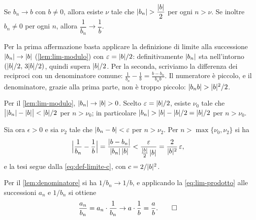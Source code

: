 \begin{lemma}\label{lem:denominatore}
Se $b_{n}\to b$ con $b\neq0$, allora esiste $\nu$ tale che $\lvert b_{n}\rvert>\dfrac{\lvert b\rvert}{2}$
per ogni $n>\nu$. Se inoltre $b_{n}\neq0$ per ogni $n$, allora
$\dfrac1{b_{n}}\to\dfrac1b$.
\end{lemma}

\begin{schema}
\end{schema}

\begin{strategia}
Per la prima affermazione basta applicare la definizione di limite alla successione
$\lvert b_{n}\rvert\to\lvert b\rvert$ (\cref{lem:lim-modulo}) con $\varepsilon=\lvert b\rvert/2$: definitivamente
$\lvert b_{n}\rvert$ sta nell'intorno $(\lvert b\rvert/2,\,3\lvert b\rvert/2)$, quindi supera $\lvert b\rvert/2$. Per la
seconda, scriviamo la differenza dei reciproci con un denominatore comune:
$\frac1{b_{n}}-\frac1b=\frac{b-b_{n}}{b_{n}b}$. Il numeratore è piccolo, e il
denominatore, grazie alla prima parte, non è troppo piccolo: $\lvert b_{n}b\rvert>\lvert b\rvert^{2}/2$.
\end{strategia}

\begin{dimostrazione}
Per il \cref{lem:lim-modulo}, $\lvert b_{n}\rvert\to\lvert b\rvert>0$. Scelto $\varepsilon=\lvert b\rvert/2$, esiste
$\nu_{0}$ tale che $\bigl|\lvert b_{n}\rvert-\lvert b\rvert\bigr|<\lvert b\rvert/2$ per $n>\nu_{0}$; in
particolare $\lvert b_{n}\rvert>\lvert b\rvert-\lvert b\rvert/2=\lvert b\rvert/2$ per $n>\nu_{0}$.

Sia ora $\epsilon>0$ e sia $\nu_{2}$ tale che $\lvert b_{n}-b\rvert<\varepsilon$ per $n>\nu_{2}$.
Per $n>\max\{\nu_{0},\nu_{2}\}$ si ha
\begin{equation}\label{eq:reciproco-passo}
  \Bigl|\frac1{b_{n}}-\frac1b\Bigr|=\frac{\lvert b-b_{n}\rvert}{\lvert b_{n}\rvert\,\lvert b\rvert}
  <\frac{\varepsilon}{\frac{\lvert b\rvert}{2}\,\lvert b\rvert}=\frac{2}{\lvert b\rvert^{2}}\,\varepsilon,
\end{equation}
e la tesi segue dalla \eqref{eq:def-limite-c}, con $c=2/\lvert b\rvert^{2}$.
\end{dimostrazione}

\begin{dimostrazione}
Per il \cref{lem:denominatore} si ha $1/b_{n}\to1/b$, e applicando la
\eqref{eq:lim-prodotto} alle successioni $a_{n}$ e $1/b_{n}$ si ottiene
\[
  \frac{a_{n}}{b_{n}}=a_{n}\cdot\frac1{b_{n}}\to a\cdot\frac1b=\frac ab. \qedhere
\]
\end{dimostrazione}

